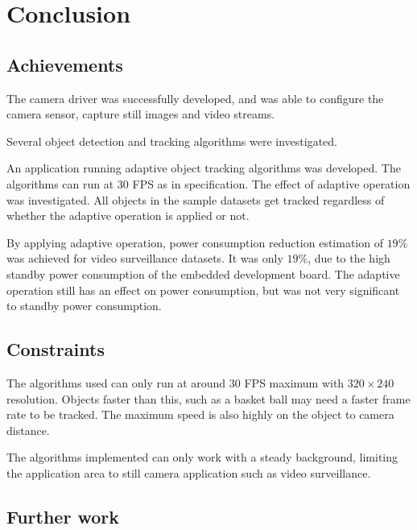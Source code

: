\chapter{Conclusion} \label{Chapter:Conclusion}

\section{Achievements}

The camera driver was successfully developed, and was able to configure the camera sensor, capture still images and video streams.

Several object detection and tracking algorithms were investigated.

An application running adaptive object tracking algorithms was developed. The algorithms can run at 30 FPS as in specification. The effect of adaptive operation was investigated. All objects in the sample datasets get tracked regardless of whether the adaptive operation is applied or not.

By applying adaptive operation, power consumption reduction estimation of $19 \%$ was achieved for  video surveillance datasets. It was only $19 \%$, due to the high standby power consumption of the embedded development board. The adaptive operation still has an effect on power consumption, but was not very significant  to standby power consumption.


\section{Constraints}

The algorithms used can only run at around 30 FPS maximum with $320 \times 240$ resolution. Objects  faster than this, such as a basket ball\mdd{,} may need a faster frame rate to be tracked. The maximum speed is also highly  on the object to camera distance.

The algorithms implemented can only work with a steady background, limiting the application area to still camera application such as video surveillance.

\section{Further work}

